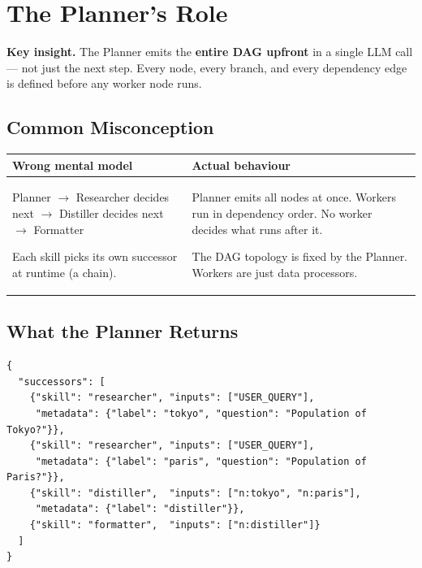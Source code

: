 \documentclass[12pt,a4paper]{article}
\begin{document}
\section{The Planner's Role}

\begin{notebox}
\textbf{Key insight.} The Planner emits the \textbf{entire DAG upfront} in a
single LLM call — not just the next step. Every node, every branch, and every
dependency edge is defined before any worker node runs.
\end{notebox}

\subsection{Common Misconception}

\begin{center}
\begin{tabular}{p{6cm} p{6cm}}
\toprule
\textbf{Wrong mental model} & \textbf{Actual behaviour} \\
\midrule
Planner $\rightarrow$ Researcher decides next $\rightarrow$ Distiller decides next $\rightarrow$ Formatter

\smallskip
Each skill picks its own successor at runtime (a chain). &

Planner emits all nodes at once. Workers run in dependency order. No worker decides what runs after it.

\smallskip
The DAG topology is fixed by the Planner. Workers are just data processors. \\
\bottomrule
\end{tabular}
\end{center}

\subsection{What the Planner Returns}

\begin{lstlisting}[style=jsoncode, caption={Typical Planner JSON output}]
{
  "successors": [
    {"skill": "researcher", "inputs": ["USER_QUERY"],
     "metadata": {"label": "tokyo", "question": "Population of Tokyo?"}},
    {"skill": "researcher", "inputs": ["USER_QUERY"],
     "metadata": {"label": "paris", "question": "Population of Paris?"}},
    {"skill": "distiller",  "inputs": ["n:tokyo", "n:paris"],
     "metadata": {"label": "distiller"}},
    {"skill": "formatter",  "inputs": ["n:distiller"]}
  ]
}
\end{lstlisting}
\end{document}
